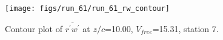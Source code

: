 \begin{figure}[H]
\centering
\texttt{[image: figs/run\_61/run\_61\_rw\_contour]}
\caption{Contour plot of $\overline{r^\prime w^\prime}$ at $z/c$=10.00, $V_{free}$=15.31, station 7.}
\end{figure}


